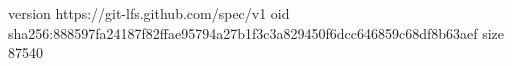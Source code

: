version https://git-lfs.github.com/spec/v1
oid sha256:888597fa24187f82ffae95794a27b1f3c3a829450f6dcc646859c68df8b63aef
size 87540
